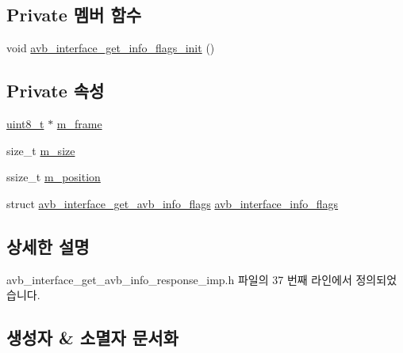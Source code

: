 \subsection*{Private 멤버 함수}
\begin{DoxyCompactItemize}
\item 
void \hyperlink{classavdecc__lib_1_1avb__interface__get__avb__info__response__imp_a8600b3a2714224aff1e64f1f2949a202}{avb\+\_\+interface\+\_\+get\+\_\+info\+\_\+flags\+\_\+init} ()
\end{DoxyCompactItemize}
\subsection*{Private 속성}
\begin{DoxyCompactItemize}
\item 
\hyperlink{stdint_8h_aba7bc1797add20fe3efdf37ced1182c5}{uint8\+\_\+t} $\ast$ \hyperlink{classavdecc__lib_1_1avb__interface__get__avb__info__response__imp_a50417969cf438e7c8d698726bbbe2ff9}{m\+\_\+frame}
\item 
size\+\_\+t \hyperlink{classavdecc__lib_1_1avb__interface__get__avb__info__response__imp_a0dc3c363255f193681c77b4d2a82e995}{m\+\_\+size}
\item 
ssize\+\_\+t \hyperlink{classavdecc__lib_1_1avb__interface__get__avb__info__response__imp_af5e691c4a8a0feb07f48440b321206cd}{m\+\_\+position}
\item 
struct \hyperlink{structavdecc__lib_1_1avb__interface__get__avb__info__response__imp_1_1avb__interface__get__avb__info__flags}{avb\+\_\+interface\+\_\+get\+\_\+avb\+\_\+info\+\_\+flags} \hyperlink{classavdecc__lib_1_1avb__interface__get__avb__info__response__imp_ab77eb13b908565111755a1a70652fb54}{avb\+\_\+interface\+\_\+info\+\_\+flags}
\end{DoxyCompactItemize}


\subsection{상세한 설명}


avb\+\_\+interface\+\_\+get\+\_\+avb\+\_\+info\+\_\+response\+\_\+imp.\+h 파일의 37 번째 라인에서 정의되었습니다.



\subsection{생성자 \& 소멸자 문서화}
